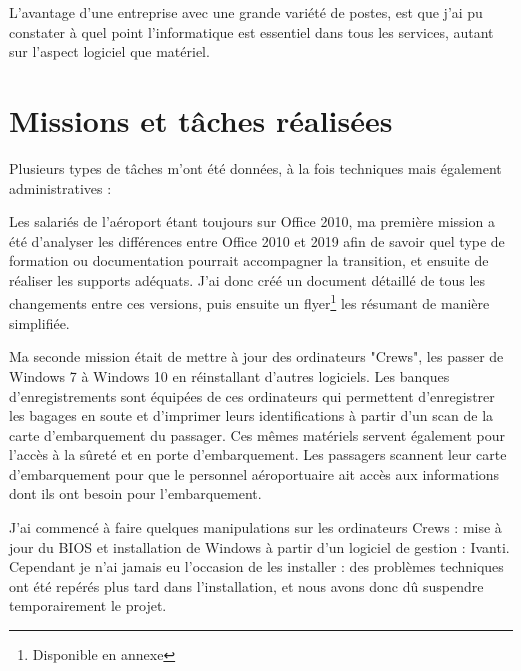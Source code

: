 L'avantage d'une entreprise avec une grande variété de postes, est que j'ai pu constater à quel point l'informatique est essentiel dans tous les services, autant sur l'aspect logiciel que matériel.

\newpage

\section{Missions et tâches réalisées}

Plusieurs types de tâches m’ont été données, à la fois techniques mais également administratives :\newline


Les salariés de l’aéroport étant toujours sur Office 2010, ma première mission a été d’analyser les différences entre Office 2010 et 2019 afin de savoir quel type de formation ou documentation pourrait accompagner la transition, et ensuite de réaliser les supports adéquats. J’ai donc créé un document détaillé de tous les changements entre ces versions, puis ensuite un flyer\footnote{Disponible en annexe} les résumant de manière simplifiée.\newline

Ma seconde mission était de mettre à jour des ordinateurs "Crews", les passer de Windows 7 à Windows 10 en réinstallant d’autres logiciels. Les banques d’enregistrements sont équipées de ces ordinateurs qui permettent d’enregistrer les bagages en soute et d’imprimer leurs identifications à partir d’un scan de la carte d’embarquement du passager. Ces mêmes matériels servent également pour l’accès à la sûreté et en porte d’embarquement. Les passagers scannent leur carte d’embarquement pour que le personnel aéroportuaire ait accès aux informations dont ils ont besoin pour l’embarquement.

J’ai commencé à faire quelques manipulations sur les ordinateurs Crews : mise à jour du BIOS et installation de Windows à partir d’un logiciel de gestion : Ivanti. Cependant je n’ai jamais eu l'occasion de les installer : des problèmes techniques ont été repérés plus tard dans l’installation, et nous avons donc dû suspendre temporairement le projet.

